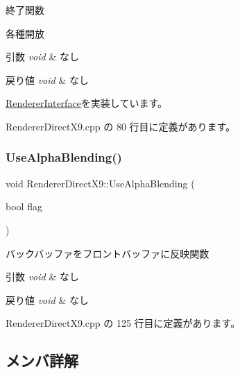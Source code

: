 終了関数 

各種開放 
\begin{DoxyParams}{引数}
{\em void} & なし \\
\hline
\end{DoxyParams}

\begin{DoxyRetVals}{戻り値}
{\em void} & なし \\
\hline
\end{DoxyRetVals}


\mbox{\hyperlink{class_renderer_interface_ada105489f9db98e7e9542b278699d558}{Renderer\+Interface}}を実装しています。



 Renderer\+Direct\+X9.\+cpp の 80 行目に定義があります。

\mbox{\label{class_renderer_direct_x9_aa555dda63bdc0f4dfc28ac506d6e8d60}} 
\subsubsection{\texorpdfstring{Use\+Alpha\+Blending()}{UseAlphaBlending()}}
{\footnotesize\ttfamily void Renderer\+Direct\+X9\+::\+Use\+Alpha\+Blending (\begin{DoxyParamCaption}\item[{bool}]{flag }\end{DoxyParamCaption})}



バックバッファをフロントバッファに反映関数 


\begin{DoxyParams}{引数}
{\em void} & なし \\
\hline
\end{DoxyParams}

\begin{DoxyRetVals}{戻り値}
{\em void} & なし \\
\hline
\end{DoxyRetVals}


 Renderer\+Direct\+X9.\+cpp の 125 行目に定義があります。



\subsection{メンバ詳解}
\mbox{\label{class_renderer_direct_x9_aba9ae366d583e965418423ec76454a61}} 
